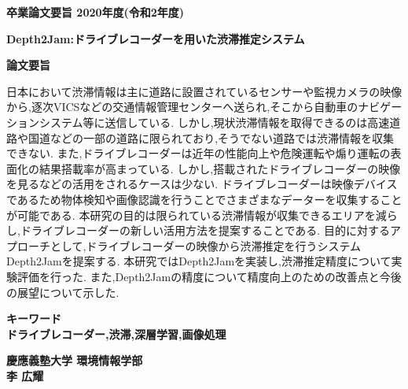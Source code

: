 \begin{center}
\textbf{\Large 卒業論文要旨 2020年度(令和2年度)}

\vspace{6.18mm}

\textbf{\Large Depth2Jam:ドライブレコーダーを用いた渋滞推定システム}
\end{center}

\vspace{10mm}

\begin{flushleft}
\textbf{論文要旨}\\
\end{flushleft}
日本において渋滞情報は主に道路に設置されているセンサーや監視カメラの映像から,逐次VICSなどの交通情報管理センターへ送られ,そこから自動車のナビゲーションシステム等に送信している.
しかし,現状渋滞情報を取得できるのは高速道路や国道などの一部の道路に限られており,そうでない道路では渋滞情報を収集できない.
また,ドライブレコーダーは近年の性能向上や危険運転や煽り運転の表面化の結果搭載率が高まっている.
しかし,搭載されたドライブレコーダーの映像を見るなどの活用をされるケースは少ない.
ドライブレコーダーは映像デバイスであるため物体検知や画像認識を行うことでさまざまなデーターを収集することが可能である.
本研究の目的は限られている渋滞情報が収集できるエリアを減らし,ドライブレコーダーの新しい活用方法を提案することである.
目的に対するアプローチとして,ドライブレコーダーの映像から渋滞推定を行うシステムDepth2Jamを提案する.
本研究ではDepth2Jamを実装し,渋滞推定精度について実験評価を行った.
また,Depth2Jamの精度について精度向上のための改善点と今後の展望について示した.

\begin{flushleft}
\textbf{キーワード}\\
\textbf{ドライブレコーダー,渋滞,深層学習,画像処理}

\end{flushleft}

\begin{flushright}
\textbf{慶應義塾大学 環境情報学部}\\
\textbf{李 広耀}
\end{flushright}
\newpage

